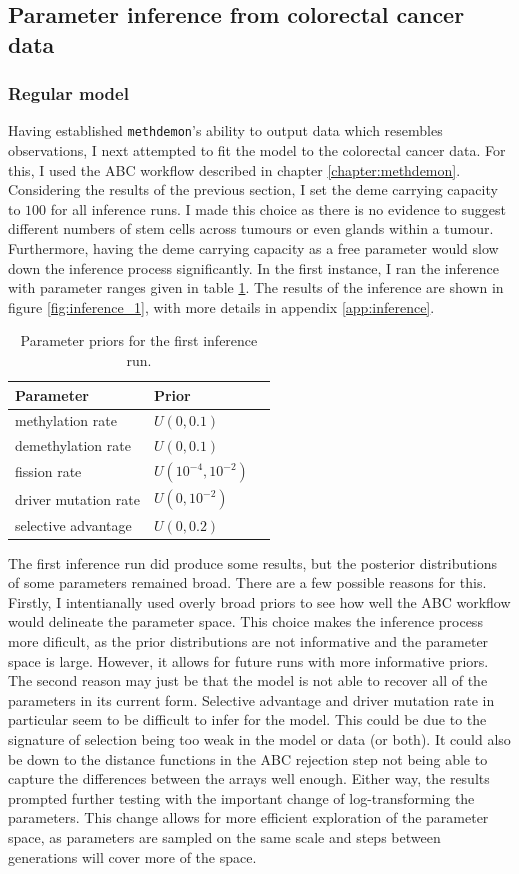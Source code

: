 \subsection{Parameter inference from colorectal cancer data}
\subsubsection{Regular model}
Having established \texttt{methdemon}'s ability to output data which resembles
observations, I next attempted to fit the model to the colorectal cancer data.
For this, I used the ABC workflow described in chapter \ref{chapter:methdemon}.
Considering the results of the previous section, I set the deme carrying
capacity to $100$ for all inference runs. I made this choice as there is no
evidence to suggest different numbers of stem cells across tumours or even
glands within a tumour. Furthermore, having the deme carrying capacity as a free
parameter would slow down the inference process significantly.
In the first instance, I ran the inference with parameter ranges given in table
\ref{tab:inf_ranges}. The results of the inference are shown in figure
\ref{fig:inference_1}, with more details in appendix \ref{app:inference}.

\begin{table}[ht]
\centering
\begin{tabular}{|l|l|l|}
\hline
Parameter & Prior \\
\hline
methylation rate & $U(0, 0.1)$ \\
demethylation rate & $U(0, 0.1)$ \\
fission rate & $U(10^{-4}, 10^{-2})$ \\
driver mutation rate & $U(0, 10^{-2})$ \\
selective advantage & $U(0, 0.2)$ \\
\hline
\end{tabular}
\caption{Parameter priors for the first inference run.}
\label{tab:inf_ranges}
\end{table}

The first inference run did produce some results, but the posterior
distributions of some parameters remained broad. There are a few possible
reasons for this. Firstly, I intentianally used overly broad priors to see how
well the ABC workflow would delineate the parameter space. This choice makes the
inference process more dificult, as the prior distributions are not informative
and the parameter space is large. However, it allows for future runs with more
informative priors. The second reason may just be that the model is not able to
recover all of the parameters in its current form. Selective advantage and
driver mutation rate in particular seem to be difficult to infer for the model.
This could be due to the signature of selection being too weak in the model or
data (or both). It could also be down to the distance functions in the ABC
rejection step not being able to capture the differences between the arrays
well enough. Either way, the results prompted further testing with the important
change of log-transforming the parameters. This change allows for more efficient
exploration of the parameter space, as parameters are sampled on the same scale
and steps between generations will cover more of the space.

